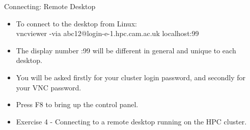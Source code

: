 \begin{frame}[fragile]{Connecting: Remote Desktop}
\begin{itemize}
\item To connect to the desktop from Linux:\\\hfill\break
{\scriptsize
\alert{vncviewer -via abc12@login-e-1.hpc.cam.ac.uk localhost:99}}
\smallskip
\item{The display number \alert{:99} will be different in general and unique to each desktop.}
\item{You will be asked firstly for your cluster login password, and secondly for your VNC password.}
\item{\alert{Press F8 to bring up the control panel.}}
\pause
\item{Exercise 4 - Connecting to a remote desktop running on the HPC cluster.}
\end{itemize}
\end{frame}








